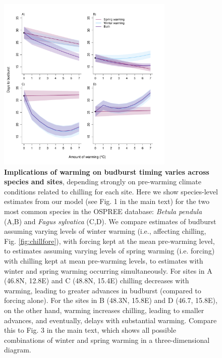 \documentclass{article}
\begin{document}
\begin{figure}[h!]
\centering
\noindent \includegraphics[width=0.75\textwidth]{..//..//analyses/bb_analysis/figures/forecasting/tempforecastbothspp_1_7_degwarm.pdf}
\caption{\textbf{Implications of warming on budburst timing varies across species and sites}, depending strongly on pre-warming climate conditions related to chilling for each site. Here we show species-level estimates from our model (see Fig. 1 in the main text) for the two most common species in the OSPREE database: \emph{Betula pendula} (A,B) and \emph{Fagus sylvatica} (C,D). We compare estimates of budburst assuming varying levels of winter warming (i.e., affecting chilling, Fig. \ref{fig:chillfore}), with forcing kept at the mean pre-warming level, to estimates assuming varying levels of spring warming (i.e. forcing) with chilling kept at mean pre-warming levels, to estimates with winter and spring warming occurring simultaneously. For sites in A (46.8\degree N, 12.8\degree E) and C (48.8\degree N, 15.4\degree E) chilling decreases with warming, leading to greater advances in budburst (compared to forcing alone). For the sites in B (48.3\degree N, 15.8\degree E) and D (46.7, 15.8\degree E), on the other hand, warming increases chilling, leading to smaller advances, and eventually, delays with substantial warming.  Compare  this to Fig. 3 in the main text, which shows all possible combinations of winter and spring warming in a three-dimensional diagram.}
\label{fig:betpenfagsyl}
\end{figure}
\end{document}
